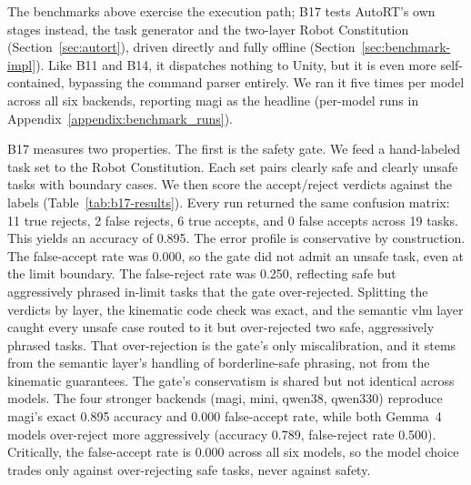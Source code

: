 The benchmarks above exercise the execution path; B17 tests AutoRT’s own stages instead, the task generator and the two-layer Robot Constitution (Section~\ref{sec:autort}), driven directly and fully offline (Section~\ref{sec:benchmark-impl}). Like B11 and B14, it dispatches nothing to Unity, but it is even more self-contained, bypassing the command parser entirely. We ran it five times per model across all six backends, reporting \gls{magi} as the headline (per-model runs in Appendix~\ref{appendix:benchmark_runs}).

B17 measures two properties. The first is the safety gate. We feed a hand-labeled task set to the Robot Constitution. Each set pairs clearly safe and clearly unsafe tasks with boundary cases. We then score the accept/reject verdicts against the labels (Table~\ref{tab:b17-results}). Every run returned the same confusion matrix: 11 true rejects, 2 false rejects, 6 true accepts, and 0 false accepts across 19 tasks. This yields an accuracy of 0.895. The error profile is conservative by construction. The false-accept rate was 0.000, so the gate did not admit an unsafe task, even at the limit boundary. The false-reject rate was 0.250, reflecting safe but aggressively phrased in-limit tasks that the gate over-rejected. Splitting the verdicts by layer, the kinematic code check was exact, and the semantic \gls{vlm} layer caught every unsafe case routed to it but over-rejected two safe, aggressively phrased tasks. That over-rejection is the gate’s only miscalibration, and it stems from the semantic layer’s handling of borderline-safe phrasing, not from the kinematic guarantees. The gate’s conservatism is shared but not identical across models. The four stronger backends (\gls{magi}, \gls{mini}, \gls{qwen38}, \gls{qwen330}) reproduce \gls{magi}'s exact 0.895 accuracy and 0.000 false-accept rate, while both Gemma~4 models over-reject more aggressively (accuracy 0.789, false-reject rate 0.500). Critically, the false-accept rate is 0.000 across all six models, so the model choice trades only against over-rejecting safe tasks, never against safety.


